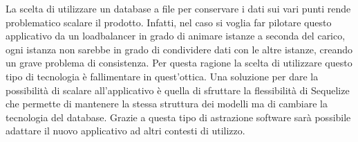 \vspace{5mm}La scelta di utilizzare un database a file per conservare i dati sui vari punti rende problematico scalare il prodotto. Infatti, nel caso si voglia far pilotare questo applicativo da un loadbalancer\cite{LoadBalancing} in grado di animare istanze a seconda del carico, ogni istanza non sarebbe in grado di condividere dati con le altre istanze, creando un grave problema di consistenza. Per questa ragione la scelta di utilizzare questo tipo di tecnologia è fallimentare in quest'ottica. Una soluzione per dare la possibilità di scalare all'applicativo è quella di sfruttare la flessibilità di Sequelize\cite{Sequelize} che permette di mantenere la stessa struttura dei modelli ma di cambiare la tecnologia del database. Grazie a questa tipo di astrazione software sarà possibile adattare il nuovo applicativo ad altri contesti di utilizzo.









